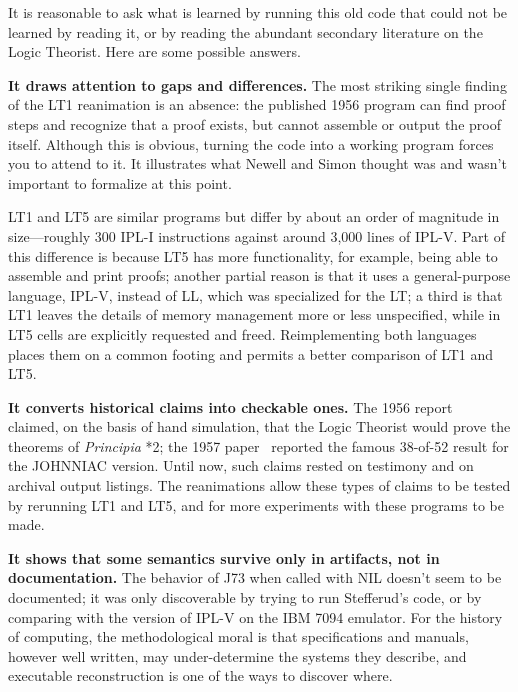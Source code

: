 \documentclass[journal]{IEEEtran}
\begin{document}
%
%

It is reasonable to ask what is learned by running this old code that
could not be learned by reading it, or by reading the abundant
secondary literature on the Logic Theorist. Here are some
possible answers.

\textbf{It draws attention to gaps and differences.}
The most striking single finding of the LT1 reanimation is an
absence: the published 1956 program can find proof steps and 
recognize that a proof exists, but cannot assemble
or output the proof itself.  Although this is obvious, turning
the code into a working program forces you to attend to it. 
It illustrates what Newell and Simon
thought was and wasn't important to formalize at this point.

LT1 and LT5 are similar programs but
differ by about an order of magnitude in size---roughly 300
IPL-I instructions against around 3,000 lines of
IPL-V.  Part of this difference is because LT5 has more
functionality, for example, being able to
assemble and print proofs; another partial reason is that it uses
a general-purpose language, IPL-V, instead of LL, which was
specialized for the LT; a third is that LT1 leaves the details
of memory management more or less unspecified, while in LT5
cells are explicitly requested and freed.  Reimplementing 
both languages places them on a common footing and permits a 
better comparison of LT1 and LT5.

\textbf{It converts historical claims into checkable ones.} The 1956
report~\cite{cip1956} claimed, on the basis of hand simulation, that the Logic
Theorist would prove the theorems of \textit{Principia} *2; the 
1957 paper~\cite{LT1957} reported the famous 38-of-52 result for the JOHNNIAC version.
Until now, such claims rested on testimony and on archival output
listings.  The reanimations allow these types of claims to be tested
by rerunning LT1 and LT5, and for more experiments with these
programs to be made.

\textbf{It shows that some semantics survive only in artifacts, not
in documentation.}  The behavior of J73 when called with NIL
doesn't seem to be documented; it was
only discoverable by trying to run Stefferud's code, or by
comparing with the version of IPL-V on the IBM 7094 emulator.
For the history of computing, the methodological moral
is that specifications and manuals, however well written, may
under-determine the systems they describe, and executable
reconstruction is one of the ways to discover where.
\end{document}
